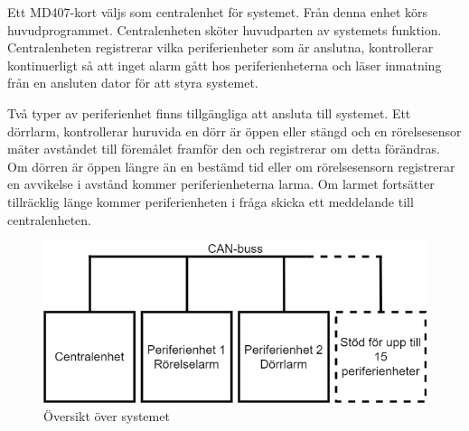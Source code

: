 \documentclass[a4paper]{article}
\begin{document}
Ett MD407-kort väljs som centralenhet för systemet.
Från denna enhet körs huvudprogrammet.
Centralenheten sköter huvudparten av systemets funktion.
Centralenheten registrerar vilka periferienheter som är anslutna, kontrollerar kontinuerligt så att inget alarm gått hos periferienheterna och läser inmatning från en ansluten dator för att styra systemet.

Två typer av periferienhet finns tillgängliga att ansluta till systemet.
Ett dörrlarm, kontrollerar huruvida en dörr är öppen eller stängd och en rörelsesensor mäter avståndet till föremålet framför den och registrerar om detta förändras.
Om dörren är öppen längre än en bestämd tid eller om rörelsesensorn registrerar en avvikelse i avstånd kommer periferienheterna larma.
Om larmet fortsätter tillräcklig länge kommer periferienheten i fråga skicka ett meddelande till centralenheten.

\begin{figure}[H]
    \centering
    \includegraphics[width=\textwidth]{canbuss-pp.png}
    \caption{Översikt över systemet}
\end{figure}

\begin{table}[H]
    \centering
    \caption{CAN-meddelandets uppbyggnad samt ett exempel på hur ett alarm-meddelande från en periferienhet ser ut.}
    \label{tab:meddelandestruktur}

\end{table}
\end{document}
